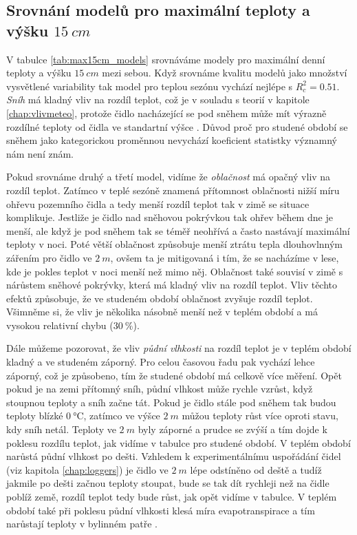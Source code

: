 \subsection{Srovnání modelů pro maximální teploty a výšku $\SI{15}{cm}$}
V tabulce \ref{tab:max15cm_models} srovnáváme modely pro maximální denní teploty a výšku $\SI{15}{cm}$ mezi sebou. Když srovnáme kvalitu modelů jako množství vysvětlené variability tak model pro teplou sezónu vychází nejlépe s $R_c^2 = 0.51$. \textit{Sníh} má kladný vliv na rozdíl teplot, což je v souladu s teorií v kapitole \ref{chap:vlivmeteo}, protože čidlo nacházející se pod sněhem může mít výrazně rozdílné teploty od čidla ve standartní výšce \parencite{snow_deFrenneForestMicroclimates}. Důvod proč pro studené období se sněhem jako kategorickou proměnnou nevychází koeficient statistky významný nám není znám.

Pokud srovnáme druhý a třetí model, vidíme že \textit{oblačnost} má opačný vliv na rozdíl teplot. Zatímco v teplé sezóně znamená přítomnost oblačnosti nižší míru ohřevu pozemního čidla a tedy menší rozdíl teplot \parencite{snow_deFrenneForestMicroclimates, cloud_overwinteringclusters} tak v zimě se situace komplikuje. Jestliže je čidlo nad sněhovou pokrývkou tak ohřev během dne je menší, ale když je pod sněhem tak se téměř neohřívá a často nastávají maximální teploty v noci. Poté větší oblačnost způsobuje menší ztrátu tepla dlouhovlnným zářením pro čidlo ve $\SI{2}{m}$, ovšem ta je mitigovaná i tím, že se nacházíme v lese, kde je pokles teplot v noci menší než mimo něj. Oblačnost také souvisí v zimě s nárůstem sněhové pokrývky, která má kladný vliv na rozdíl teplot. Vliv těchto efektů způsobuje, že ve studeném období oblačnost zvyšuje rozdíl teplot. Všimněme si, že vliv je několika násobně menší než v teplém období a má vysokou relativní chybu ($\SI{30}{\%}$).

Dále můžeme pozorovat, že vliv \textit{půdní vlhkosti} na rozdíl teplot je v teplém období kladný a ve studeném záporný. Pro celou časovou řadu pak vychází lehce záporný, což je způsobeno, tím že studené období má celkově více měření. Opět pokud je na zemi přítomný sníh, půdní vlhkost může rychle vzrůst, když stoupnou teploty a sníh začne tát. Pokud je čidlo stále pod sněhem tak budou teploty blízké $\SI{0}{\celsius}$, zatímco ve výšce $\SI{2}{m}$ můžou teploty růst více oproti stavu, kdy sníh netál. Teploty ve $\SI{2}{m}$ byly záporné a prudce se zvýší a tím dojde k poklesu rozdílu teplot, jak vidíme v tabulce pro studené období. V teplém období narůstá půdní vlhkost po dešti. Vzhledem k experimentálnímu uspořádání čidel (viz kapitola \ref{chap:loggers}) je čidlo ve $\SI{2}{m}$ lépe odstíněno od deště a tudíž jakmile po dešti začnou teploty stoupat, bude se tak dít rychleji než na čidle poblíž země, rozdíl teplot tedy bude růst, jak opět vidíme v tabulce. V teplém období také při poklesu půdní vlhkosti klesá míra evapotranspirace a tím narůstají teploty v bylinném patře \parencite{snow_deFrenneForestMicroclimates}.

